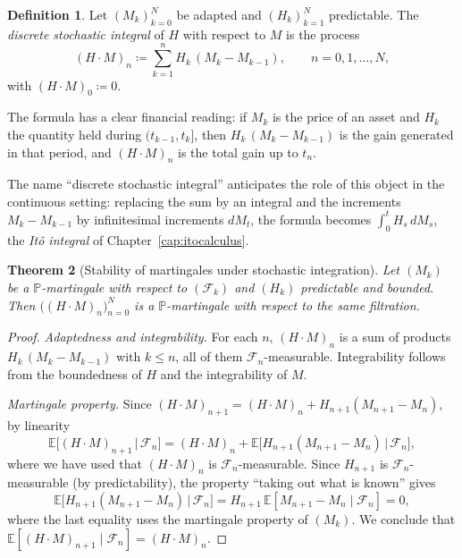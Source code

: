 \documentclass[11pt,a4paper,oneside]{report}
\theoremstyle{plain}
\newtheorem{teorema}{Theorem}[chapter]
\theoremstyle{definition}
\newtheorem{definicion}[teorema]{Definition}
\theoremstyle{remark}
\newcommand{\E}{\mathbb{E}}
\newcommand{\PP}{\mathbb{P}}
\newcommand{\F}{\mathcal{F}}
\newcommand{\1}{\mathbf{1}}
\newcommand{\eqdef}{\coloneqq}
\begin{document}
\medskip

\begin{definicion}
\label{def:integral_discreta}
Let $(M_k)_{k=0}^{N}$ be adapted and $(H_k)_{k=1}^{N}$ predictable.
The \emph{discrete stochastic integral} of $H$ with respect to $M$ is
the process
\begin{equation}\label{eq:integral_discreta}
  (H \cdot M)_n \eqdef \sum_{k=1}^{n} H_k\, (M_k - M_{k-1}),
  \qquad n = 0, 1, \ldots, N,
\end{equation}
with $(H \cdot M)_0 \eqdef 0$.
\end{definicion}

The formula has a clear financial reading: if $M_k$ is the price
of an asset and $H_k$ the quantity held during $(t_{k-1}, t_k]$, then
$H_k\, (M_k - M_{k-1})$ is the gain generated in that period, and
$(H \cdot M)_n$ is the total gain up to $t_n$.

The name ``discrete stochastic integral'' anticipates the role of this
object in the continuous setting: replacing the sum by an integral and
the increments $M_k - M_{k-1}$ by infinitesimal increments $dM_t$, the
formula becomes $\int_0^t H_s\, dM_s$, the \emph{Itô integral} of
Chapter~\ref{cap:itocalculus}.

\medskip

\begin{teorema}[Stability of martingales under stochastic integration]
\label{teo:integral_preserva_martingala}
Let $(M_k)$ be a $\PP$-martingale with respect to $(\F_k)$ and $(H_k)$
predictable and bounded. Then $\bigl((H \cdot M)_n\bigr)_{n=0}^{N}$ is
a $\PP$-martingale with respect to the same filtration.
\end{teorema}

\begin{proof}
\emph{Adaptedness and integrability.} For each $n$, $(H \cdot M)_n$ is
a sum of products $H_k\, (M_k - M_{k-1})$ with $k \leq n$, all of them
$\F_n$-measurable. Integrability follows from the boundedness of $H$
and the integrability of $M$.

\emph{Martingale property.} Since
$(H \cdot M)_{n+1} = (H \cdot M)_n + H_{n+1}(M_{n+1} - M_n)$, by
linearity
\begin{equation*}
  \E\bigl[(H \cdot M)_{n+1} \,\big|\, \F_n\bigr]
  = (H \cdot M)_n + \E\bigl[H_{n+1}(M_{n+1} - M_n) \,\big|\, \F_n\bigr],
\end{equation*}
where we have used that $(H\cdot M)_n$ is $\F_n$-measurable. Since
$H_{n+1}$ is $\F_n$-measurable (by predictability), the property
``taking out what is known'' gives
\begin{equation*}
  \E\bigl[H_{n+1}(M_{n+1} - M_n) \,\big|\, \F_n\bigr]
  = H_{n+1}\, \E[M_{n+1} - M_n \mid \F_n] = 0,
\end{equation*}
where the last equality uses the martingale property of $(M_k)$. We
conclude that $\E[(H \cdot M)_{n+1} \mid \F_n] = (H \cdot M)_n$.
\end{proof}
\end{document}
